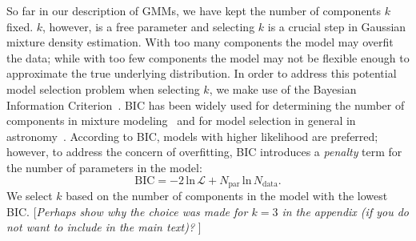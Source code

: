 \documentclass[12pt, letterpaper, preprint]{aastex}
\newcommand{\beq}{\begin{equation}}
\newcommand{\eeq}{\end{equation}}
\newcommand{\ms}[1]{{\color{orange}{\bf MS:}} {[\em #1}]}
\newcommand{\gmms}{{\small{GMM}s}\xspace}
\newcommand{\bic}{{\small{BIC}}\xspace}
\begin{document}

So far in our description of \gmms, we have kept
the number of components $k$ fixed. $k$, however, is a free 
parameter and selecting $k$ is a crucial step in Gaussian mixture
density estimation. With too many components the model may overfit 
the data; while with too few components the model may not be flexible
enough to approximate the true 
underlying distribution. In order to address this potential model selection problem
when selecting $k$, we make use of the Bayesian Information 
Criterion~\citep[\bic;][]{schwarz1978}. \bic has been widely used for 
determining the number of components in mixture 
modeling~\citep[\emph{e.g.}][]{leroux1992,roeder1997,fraley1998,steele2010performance}
and for model selection in general in 
astronomy~\citep[\emph{e.g.}][]{liddle2007,broderick2011,wilkinson2015,vakili2016}.
According to \bic, models with higher likelihood are preferred; however, 
to address the concern of overfitting, \bic introduces a \emph{penalty} term 
for the number of parameters in the model: 
\beq \label{eq:bic}
\mathrm{BIC} = -2\,\mathrm{ln}\,\mathcal{L} + N_\mathrm{par}\,\mathrm{ln}\,N_\mathrm{data}.
\eeq
We select $k$ based on the number of components in the model with the 
lowest \bic. \ms{Perhaps show why the choice was made for $k=3$ in the appendix (if you do
  not want to include in the main text)? }

\end{document}
